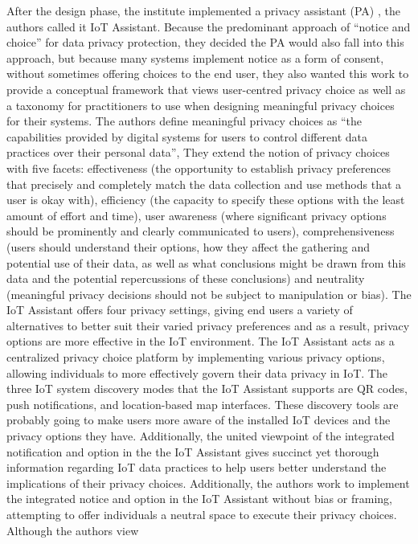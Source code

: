 After the design phase, the institute implemented a privacy assistant (PA) \cite{FengDesign},
the authors called it IoT Assistant. Because the predominant approach of
``notice and choice'' for data privacy protection, they decided the PA would
also fall into this approach, but because many systems implement notice
as a form of consent, without sometimes offering choices to the end user,
they also wanted this work to provide a conceptual framework that views
user-centred privacy choice as well as a taxonomy for practitioners to
use when designing meaningful privacy choices for their systems. The authors
define meaningful privacy choices as ``the capabilities provided by digital
systems for users to control different data practices over their personal
data'', They extend the notion of privacy choices with five facets: effectiveness
(the opportunity to establish privacy preferences that precisely and completely
match the data collection and use methods that a user is okay with), efficiency
(the capacity to specify these options with the least amount of effort and
time), user awareness (where significant privacy options should be prominently
and clearly communicated to users), comprehensiveness (users should understand
their options, how they affect the gathering and potential use of their
data, as well as what conclusions might be drawn from this data and the
potential repercussions of these conclusions) and neutrality (meaningful
privacy decisions should not be subject to manipulation or bias). The IoT
Assistant offers four privacy settings, giving end users a variety of alternatives
to better suit their varied privacy preferences and as a result, privacy
options are more effective in the IoT environment. The IoT Assistant acts
as a centralized privacy choice platform by implementing various privacy
options, allowing individuals to more effectively govern their data privacy
in IoT. The three IoT system discovery modes that the IoT Assistant supports
are QR codes, push notifications, and location-based map interfaces. These
discovery tools are probably going to make users more aware of the installed
IoT devices and the privacy options they have. Additionally, the united
viewpoint of the integrated notification and option in the the IoT Assistant
gives succinct yet thorough information regarding IoT data practices to
help users better understand the implications of their privacy choices.
Additionally, the authors work to implement the integrated notice and option
in the IoT Assistant without bias or framing, attempting to offer individuals
a neutral space to execute their privacy choices. Although the authors view
